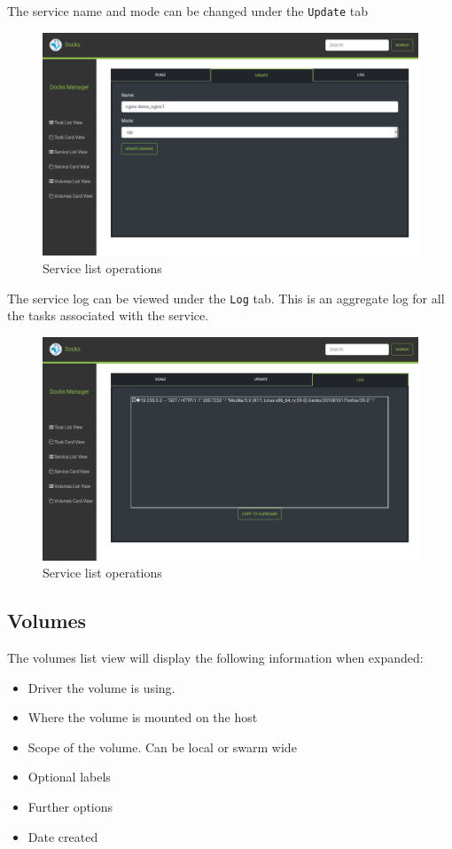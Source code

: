 \documentclass[]{article}
\providecommand{\tightlist}{%
	\setlength{\itemsep}{0pt}\setlength{\parskip}{0pt}}
\let\oldtexttt\texttt
\renewcommand{\texttt}[1]{
	\colorbox{Light}{\oldtexttt{#1}}
}
\begin{document}
The service name and mode can be changed under the \texttt{Update} tab
\begin{figure}[H]
	\centering
	\includegraphics[scale=0.4]{service_list_update.png}
	\caption{Service list operations}
\end{figure}

The service log can be viewed under the \texttt{Log} tab. This is an aggregate log for all the tasks
associated with the service.
\begin{figure}[H]
	\centering
	\includegraphics[scale=0.4]{service_list_log.png}
	\caption{Service list operations}
\end{figure}

\subsection{Volumes}

The volumes list view will display the following information when expanded:
\begin{itemize}
	\tightlist
	\item Driver the volume is using.
	\item Where the volume is mounted on the host
	\item Scope of the volume. Can be local or swarm wide
	\item Optional labels
	\item Further options
	\item Date created
\end{itemize}
\end{document}

